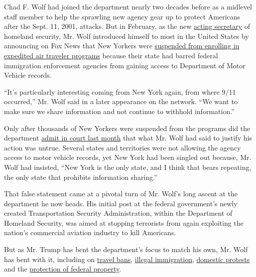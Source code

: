 Chad F. Wolf had joined the department nearly two decades before as a
midlevel staff member to help the sprawling new agency gear up to
protect Americans after the Sept. 11, 2001, attacks. But in February, as
the new
\href{https://www.nytimes3xbfgragh.onion/2019/11/01/us/politics/trump-chad-wolf-dhs.html}{acting
secretary} of homeland security, Mr. Wolf introduced himself to most in
the United States by announcing on Fox News that New Yorkers were
\href{https://www.nytimes3xbfgragh.onion/2020/02/06/us/politics/dhs-new-york-global-entry.html}{suspended
from enrolling in expedited air traveler programs} because their state
had barred federal immigration enforcement agencies from gaining access
to Department of Motor Vehicle records.

``It's particularly interesting coming from New York again, from where
9/11 occurred,'' Mr. Wolf said in a later appearance on the network.
``We want to make sure we share information and not continue to withhold
information.''

Only after thousands of New Yorkers were suspended from the programs did
the department
\href{https://www.nytimes3xbfgragh.onion/2020/07/23/nyregion/trusted-traveler-homeland-security.html}{admit
in court last month} that what Mr. Wolf had said to justify his action
was untrue. Several states and territories were not allowing the agency
access to motor vehicle records, yet New York had been singled out
because, Mr. Wolf had insisted, ``New York is the only state, and I
think that bears repeating, the only state that prohibits information
sharing.''

That false statement came at a pivotal turn of Mr. Wolf's long ascent at
the department he now heads. His initial post at the federal
government's newly created Transportation Security Administration,
within the Department of Homeland Security, was aimed at stopping
terrorists from again exploiting the nation's commercial aviation
industry to kill Americans.

But as Mr. Trump has bent the department's focus to match his own, Mr.
Wolf has bent with it, including on
\href{https://www.nytimes3xbfgragh.onion/2020/01/31/us/politics/trump-travel-ban.html}{travel
bans},
\href{https://www.nytimes3xbfgragh.onion/2020/03/20/us/politics/trump-border-coronavirus.html}{illegal
immigration},
\href{https://www.nytimes3xbfgragh.onion/2020/07/28/us/federal-agents-portland-seattle-protests.html}{domestic
protests} and the
\href{https://www.nytimes3xbfgragh.onion/2020/07/10/us/politics/homeland-security-statues-trump.html}{protection
of federal property}.

